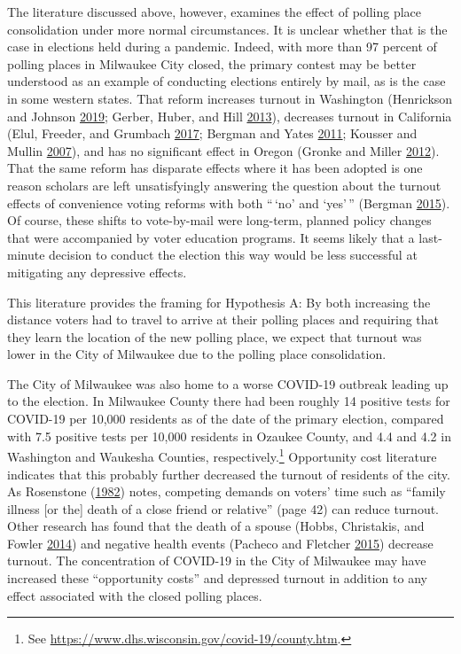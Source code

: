 \documentclass[
  12pt,
]{article}
\begin{document}
The literature discussed above, however, examines the effect of polling place consolidation under more normal circumstances. It is unclear whether that is the case in elections held during a pandemic. Indeed, with more than 97 percent of polling places in Milwaukee City closed, the primary contest may be better understood as an example of conducting elections entirely by mail, as is the case in some western states. That reform increases turnout in Washington (Henrickson and Johnson \protect\hyperlink{ref-Henrickson2019}{2019}; Gerber, Huber, and Hill \protect\hyperlink{ref-Gerber2013}{2013}), decreases turnout in California (Elul, Freeder, and Grumbach \protect\hyperlink{ref-Elul2017}{2017}; Bergman and Yates \protect\hyperlink{ref-Bergman2011}{2011}; Kousser and Mullin \protect\hyperlink{ref-Kousser2007}{2007}), and has no significant effect in Oregon (Gronke and Miller \protect\hyperlink{ref-Gronke2012}{2012}). That the same reform has disparate effects where it has been adopted is one reason scholars are left unsatisfyingly answering the question about the turnout effects of convenience voting reforms with both ``\,`no' and `yes'\,'' (Bergman \protect\hyperlink{ref-Bergman2015}{2015}). Of course, these shifts to vote-by-mail were long-term, planned policy changes that were accompanied by voter education programs. It seems likely that a last-minute decision to conduct the election this way would be less successful at mitigating any depressive effects.

This literature provides the framing for Hypothesis A: By both increasing the distance voters had to travel to arrive at their polling places and requiring that they learn the location of the new polling place, we expect that turnout was lower in the City of Milwaukee due to the polling place consolidation.

The City of Milwaukee was also home to a worse COVID-19 outbreak leading up to the election. In Milwaukee County there had been roughly 14 positive tests for COVID-19 per 10,000 residents as of the date of the primary election, compared with 7.5 positive tests per 10,000 residents in Ozaukee County, and 4.4 and 4.2 in Washington and Waukesha Counties, respectively.\footnote{See \url{https://www.dhs.wisconsin.gov/covid-19/county.htm}.} Opportunity cost literature indicates that this probably further decreased the turnout of residents of the city. As Rosenstone (\protect\hyperlink{ref-Rosenstone1982}{1982}) notes, competing demands on voters' time such as ``family illness {[}or the{]} death of a close friend or relative'' (page 42) can reduce turnout. Other research has found that the death of a spouse (Hobbs, Christakis, and Fowler \protect\hyperlink{ref-Hobbs2014}{2014}) and negative health events (Pacheco and Fletcher \protect\hyperlink{ref-Pacheco2015}{2015}) decrease turnout. The concentration of COVID-19 in the City of Milwaukee may have increased these ``opportunity costs'' and depressed turnout in addition to any effect associated with the closed polling places.
\end{document}
